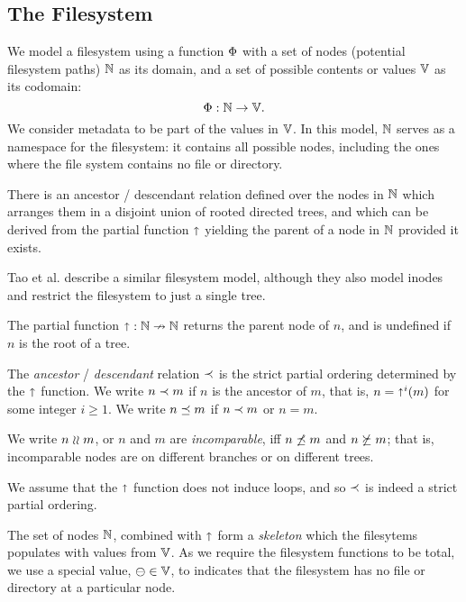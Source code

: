 
\subsection{The Filesystem}

\begin{mydef}[Filesystems]
We model a filesystem
using a function $\Phi$ with a set of nodes (potential filesystem paths) $\mathbb{N}$ as its domain,
and a set of possible contents or values $\mathbb{V}$ as its codomain:
\[ \Phi: \mathbb{N} \rightarrow \mathbb{V}. \]
We consider metadata to be part of the values in $\mathbb{V}$.
In this model, $\mathbb{N}$ 
serves as a namespace for the filesystem:
it contains all possible nodes, including the ones 
where the file system contains no file or directory.
\end{mydef}

There is an ancestor / descendant relation defined over the nodes in $\mathbb{N}$
which arranges them in a disjoint union of rooted directed trees,
and which can be derived from the partial function $\mathord{\shortuparrow}$ yielding
the parent of a node in $\mathbb{N}$ provided it exists.

Tao et al. \cite{TSR} describe a similar filesystem model, although
they also model inodes and restrict the filesystem to just a single tree.


\begin{mydef}
The partial function $\mathord{\shortuparrow}:\mathbb{N}\nrightarrow\mathbb{N}$
returns the parent node of $n$,
and is undefined if $n$ is the root of a tree.

The \emph{ancestor} / \emph{descendant} relation $\prec$ is the
strict partial ordering determined by the $\mathord{\shortuparrow}$ function.
We write $n\prec m$ if $n$ is the ancestor of $m$,
that is, $n=\mathord{\shortuparrow}^i(m)$ for some integer $i\ge 1$.
We write $n\preceq m$ if $n\prec m$ or $n=m$.

We write $n\mathrel{\wr\wr} m$, or $n$ and $m$ are \emph{incomparable},
iff $n\not\preceq m$ and $n\not\succeq m$;
that is, incomparable nodes are on different branches or on different trees.
\end{mydef}

We assume that the $\mathord{\shortuparrow}$ function does not induce loops, and so
$\prec$ is indeed a strict partial ordering.

The set of nodes $\mathbb{N}$, combined with $\mathord{\shortuparrow}$ form a \emph{skeleton}
which the filesytems populates with values from $\mathbb{V}$.
As we require the filesystem functions to be total,
we use a special value, $\ominus\in\mathbb{V}$, to indicates that the filesystem
has no file or directory at a particular node.

